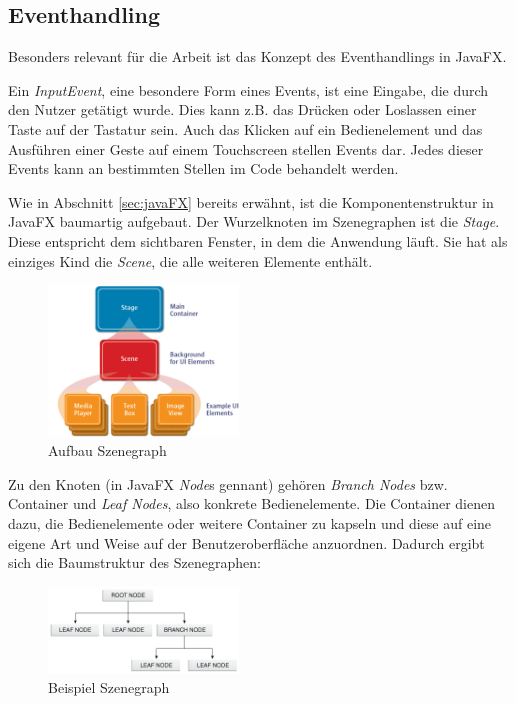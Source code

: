 \subsection{Eventhandling} \label{sec:javafxEventhandling}
Besonders relevant für die Arbeit ist das Konzept des Eventhandlings in JavaFX.\par
Ein \textit{InputEvent}, eine besondere Form eines Events, ist eine Eingabe, die durch den Nutzer getätigt wurde. Dies kann z.B. das Drücken oder Loslassen einer Taste auf der Tastatur sein. Auch das Klicken auf ein Bedienelement und das Ausführen einer Geste auf einem Touchscreen stellen Events dar. Jedes dieser Events kann an bestimmten Stellen im Code behandelt werden.\par
Wie in Abschnitt \ref{sec:javaFX} bereits erwähnt, ist die Komponentenstruktur in JavaFX baumartig aufgebaut. Der Wurzelknoten im Szenegraphen ist die \textit{Stage}. Diese entspricht dem sichtbaren Fenster, in dem die Anwendung läuft. Sie hat als einziges Kind die \textit{Scene}, die alle weiteren Elemente enthält.
\begin{figure}[H]
 \centering
 \includegraphics[width=0.45\textwidth]{grafiken/scenegraph.png}
 \caption{Aufbau Szenegraph \cite{Jakob2015}}
 \label{fig:scenegraph}
\end{figure} 
Zu den Knoten (in JavaFX \textit{Node}s gennant) gehören \textit{Branch Nodes} bzw. Container und \textit{Leaf Nodes}, also konkrete Bedienelemente. Die Container dienen dazu, die Bedienelemente oder weitere Container zu kapseln und diese auf eine eigene Art und Weise auf der Benutzeroberfläche anzuordnen. Dadurch ergibt sich die Baumstruktur des Szenegraphen:
\begin{figure}[H]
 \centering
 \includegraphics[width=0.45\textwidth]{grafiken/scenegraph2.png}
 \caption{Beispiel Szenegraph \cite{Hommel2013}}
 \label{fig:scenegraph2}
\end{figure} 
